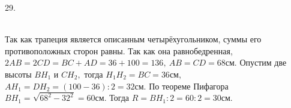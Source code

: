 29. \begin{figure}[ht!]
\end{figure}\\
Так как трапеция является описанным четырёхугольником, суммы его противоположных сторон равны. Так как она равнобедренная, $2AB=2CD=BC+AD=36+100=136,\ AB=CD=68$см. Опустим две высоты $BH_1$ и $CH_2,$ тогда $H_1H_2=BC=36$см, $AH_1=DH_2=(100-36):2=32$см. По теореме Пифагора $BH_1=\sqrt{68^2-32^2}=60$см. Тогда $R=BH_1:2=60:2=30$см.\\
